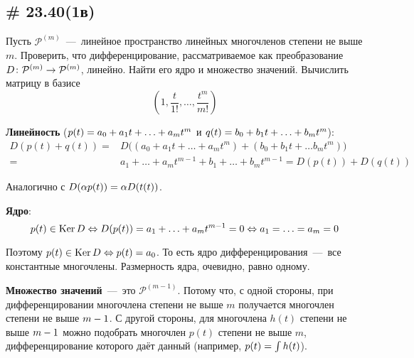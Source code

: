 \documentclass[a4paper,12pt]{article}
\begin{document}
  
  \subsection{\# 23.40(1в)}
  
  Пусть $\mathcal P^{(m)}$~---~линейное пространство линейных многочленов степени не выше $m$.
  Проверить, что дифференцирование, рассматриваемое как преобразование $D\colon \mathcal P^{(m)} \hm\to \mathcal P^{(m)}$, линейно.
  Найти его ядро и множество значений.
  Вычислить матрицу в базисе
  \[
    \left(1, \frac{t}{1!}, \ldots, \frac{t^m}{m!}\right)
  \]
  
  \begin{solution}
    \textbf{Линейность} ($p(t) \hm= a_0 \hm+ a_1 t \hm+ \ldots \hm+ a_m t^m$ и $q(t) \hm= b_0 \hm+ b_1 t \hm+ \ldots \hm+ b_m t^m$):
    \begin{equation*}
    \begin{split}
      D(p(t) + q(t)) = &D\bigl((a_0 + a_1 t + \ldots + a_m t^m) + (b_0 + b_1 t + \ldots b_m t^m)\bigr)\\
      = &a_1 + \ldots + a_m t^{m - 1} + b_1 + \ldots + b_m t^{m - 1}
      = D(p(t)) + D(q(t))
    \end{split}
    \end{equation*}
    
    Аналогично с $D(\alpha p(t)) \hm= \alpha D(t(t))$.
    
    \medskip
    
    \textbf{Ядро}:
    \[
      p(t) \in \operatorname{Ker} D \Leftrightarrow D(p(t)) = a_1 + \ldots + a_m t^{m - 1} = 0 \Leftrightarrow a_1 = \ldots = a_m = 0
    \]
    
    Поэтому $p(t) \in \Ker D \hm\Leftrightarrow p(t) \hm= a_0$.
    То есть ядро дифференцирования~---~все константные многочлены.
    Размерность ядра, очевидно, равно одному.
    
    \medskip
    
    \textbf{Множество значений}~---~это $\mathcal P^{(m - 1)}$.
    Потому что, с одной стороны, при дифференцировании многочлена степени не выше $m$ получается многочлен степени не выше $m \hm- 1$.
    С другой стороны, для многочлена $h(t)$ степени не выше $m \hm- 1$ можно подобрать многочлен $p(t)$ степени не выше $m$, дифференцирование которого даёт данный (например, $p(t) \hm= \int h(t)$).
    
    \medskip
    

\end{solution}
\end{document}
